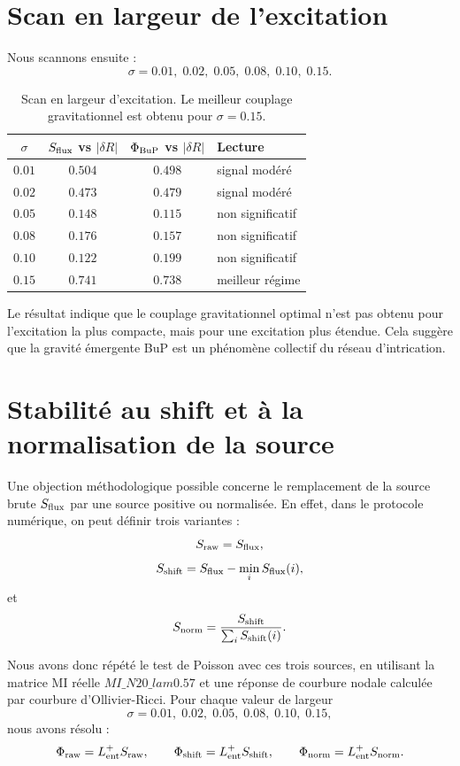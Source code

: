 \documentclass[11pt,a4paper]{article}
\begin{document}
\section{Scan en largeur de l'excitation}

Nous scannons ensuite :
\[
\sigma
=
0.01,\;0.02,\;0.05,\;0.08,\;0.10,\;0.15.
\]

\begin{table}[htbp]
\centering
\begin{tabular}{c c c l}
\toprule
\(\sigma\) & \(S_{\rm flux}\) vs \(|\delta R|\) & \(\Phi_{\rm BuP}\) vs \(|\delta R|\) & Lecture \\
\midrule
\(0.01\) & \(0.504\) & \(0.498\) & signal modéré \\
\(0.02\) & \(0.473\) & \(0.479\) & signal modéré \\
\(0.05\) & \(0.148\) & \(0.115\) & non significatif \\
\(0.08\) & \(0.176\) & \(0.157\) & non significatif \\
\(0.10\) & \(0.122\) & \(0.199\) & non significatif \\
\(0.15\) & \(0.741\) & \(0.738\) & meilleur régime \\
\bottomrule
\end{tabular}
\caption{
Scan en largeur d'excitation. Le meilleur couplage gravitationnel est obtenu
pour \(\sigma=0.15\).
}
\end{table}

Le résultat indique que le couplage gravitationnel optimal n'est pas obtenu pour
l'excitation la plus compacte, mais pour une excitation plus étendue. Cela
suggère que la gravité émergente BuP est un phénomène collectif du réseau
d'intrication.

\section{Stabilité au shift et à la normalisation de la source}

Une objection méthodologique possible concerne le remplacement de la source
brute \(S_{\rm flux}\) par une source positive ou normalisée. En effet, dans le
protocole numérique, on peut définir trois variantes :
\[
S_{\rm raw}=S_{\rm flux},
\]
\[
S_{\rm shift}
=
S_{\rm flux}
-
\min_i S_{\rm flux}(i),
\]
et
\[
S_{\rm norm}
=
\frac{
S_{\rm shift}
}{
\sum_i S_{\rm shift}(i)
}.
\]

Nous avons donc répété le test de Poisson avec ces trois sources, en utilisant
la matrice MI réelle \(MI\_N20\_lam0.57\) et une réponse de courbure nodale
calculée par courbure d'Ollivier-Ricci. Pour chaque valeur de largeur
\[
\sigma
=
0.01,\;0.02,\;0.05,\;0.08,\;0.10,\;0.15,
\]
nous avons résolu :
\[
\Phi_{\rm raw}
=
L_{\rm ent}^{+}S_{\rm raw},
\qquad
\Phi_{\rm shift}
=
L_{\rm ent}^{+}S_{\rm shift},
\qquad
\Phi_{\rm norm}
=
L_{\rm ent}^{+}S_{\rm norm}.
\]
\end{document}
